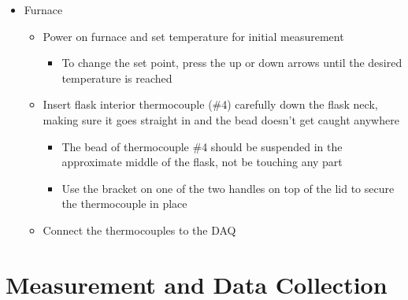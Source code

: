\documentclass[letterpaper,11pt]{article}
\begin{document}
\begin{itemize}
    \item Furnace
        
        \begin{itemize}
        \item Power on furnace and set temperature for initial measurement
        
                \begin{itemize}
                \item To change the set point, press the up or down arrows until 
                    the desired temperature is reached
                \end{itemize}
                
        \item Insert flask interior thermocouple (\#4) carefully down the flask 
            neck, making sure it goes straight in and the bead doesn't get 
            caught anywhere
                
                \begin{itemize}
                \item The bead of thermocouple \#4 should be suspended in the 
                    approximate middle of the flask, not be touching any part
                \item Use the bracket on one of the two handles on top of the 
                    lid to secure the thermocouple in place
                \end{itemize}
                
        \item Connect the thermocouples to the DAQ
        \end{itemize}
        
    \end{itemize}

\section{Measurement and Data Collection}
\end{document}
